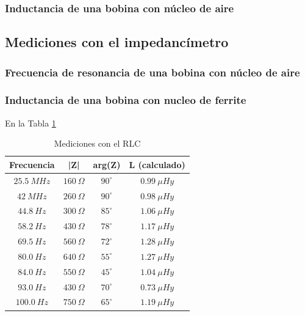 \documentclass[a4paper,10pt]{article}
\begin{document}
		\subsubsection{Inductancia de una bobina con n\'ucleo de aire}
		
		\subsection{Mediciones con el impedanc\'imetro}
		\subsubsection{Frecuencia de resonancia de una bobina con n\'ucleo de aire}
		\subsubsection{Inductancia de una bobina con nucleo de ferrite}
		En la Tabla \ref{tabIMPbobina}
		\begin{table}[!htp]
					\centering
					\begin{tabular}{|c|c|c|c}
						\hline
			    		Frecuencia & |Z| & arg(Z)  & L (calculado) \\
						\hline
						$25.5~MHz$ & $160~\Omega$ & $90^{\circ}$ & $0.99~\mu Hy$ \\
						\hline
						$42~MHz$ & $260~\Omega$ & $90^{\circ}$ & $0.98~\mu Hy$\\
						\hline
						$44.8~Hz$ & $300~\Omega$ & $85^{\circ}$ & $1.06~\mu Hy$ \\
						\hline
						$58.2~Hz$ & $430~\Omega$ & $78^{\circ}$ & $1.17~\mu Hy$ \\
						\hline									
						$69.5~Hz$ & $560~\Omega$ & $72^{\circ}$ & $1.28~\mu Hy$ \\
						\hline									
						$80.0~Hz$& $640~\Omega$ & $55^{\circ}$ & $1.27~\mu Hy$ \\
						\hline									
						$84.0~Hz$ & $550~\Omega$ & $45^{\circ}$ & $1.04~\mu Hy$ \\
						\hline									
						$93.0~Hz$ & $430~\Omega$ & $70^{\circ}$ & $0.73~\mu Hy$ \\
						\hline									
						$100.0~Hz$ & $750~\Omega$ & $65^{\circ}$ & $1.19~\mu Hy$ \\
						\hline			
					\end{tabular}
					\caption{Mediciones con el RLC} \label{tabIMPbobina}
				\end{table}	
					
\end{document}
